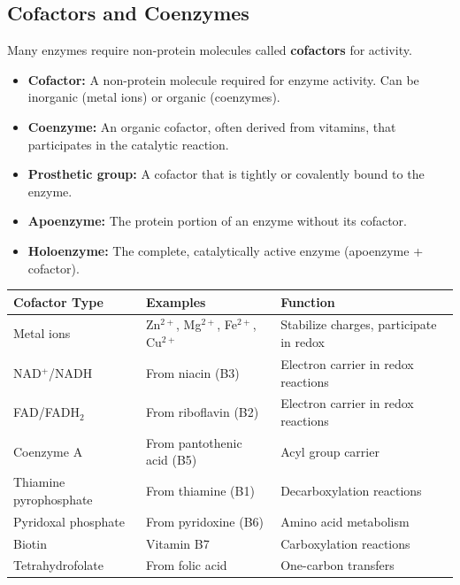 \subsection{Cofactors and Coenzymes}

Many enzymes require non-protein molecules called \textbf{cofactors} for activity.

\begin{definition}
\begin{itemize}
    \item \textbf{Cofactor:} A non-protein molecule required for enzyme activity. Can be inorganic (metal ions) or organic (coenzymes).
    \item \textbf{Coenzyme:} An organic cofactor, often derived from vitamins, that participates in the catalytic reaction.
    \item \textbf{Prosthetic group:} A cofactor that is tightly or covalently bound to the enzyme.
    \item \textbf{Apoenzyme:} The protein portion of an enzyme without its cofactor.
    \item \textbf{Holoenzyme:} The complete, catalytically active enzyme (apoenzyme + cofactor).
\end{itemize}
\end{definition}

\begin{center}
\begin{tabular}{lll}
\toprule
\textbf{Cofactor Type} & \textbf{Examples} & \textbf{Function} \\
\midrule
Metal ions & Zn$^{2+}$, Mg$^{2+}$, Fe$^{2+}$, Cu$^{2+}$ & Stabilize charges, participate in redox \\
NAD$^+$/NADH & From niacin (B3) & Electron carrier in redox reactions \\
FAD/FADH$_2$ & From riboflavin (B2) & Electron carrier in redox reactions \\
Coenzyme A & From pantothenic acid (B5) & Acyl group carrier \\
Thiamine pyrophosphate & From thiamine (B1) & Decarboxylation reactions \\
Pyridoxal phosphate & From pyridoxine (B6) & Amino acid metabolism \\
Biotin & Vitamin B7 & Carboxylation reactions \\
Tetrahydrofolate & From folic acid & One-carbon transfers \\
\bottomrule
\end{tabular}
\end{center}


